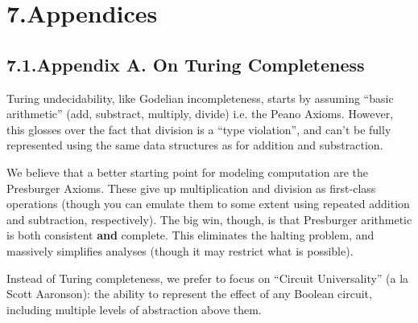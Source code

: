 \documentclass[preprint]{{sigplanconf}}
\begin{document}
\section{7.\hspace*{0.5em}Appendices}\label{sec-appendices}%

\subsection{7.1.\hspace*{0.5em}Appendix A. On Turing Completeness}\label{sec-appendix-a-on-turing-completeness}%

\noindent{}Turing undecidability, like Godelian incompleteness, starts by assuming \textquotedblleft{}basic arithmetic\textquotedblright{} (add, substract, multiply, divide) \textendash{} i.e. the Peano Axioms. However, this glosses over the fact that division is a \textquotedblleft{}type violation\textquotedblright{}, and can't be fully represented using the same data structures as for addition and substraction.%

We believe that a better starting point for modeling computation are the Presburger Axioms.  These give up multiplication and division as first-class operations (though you can emulate them to some extent using repeated addition and subtraction, respectively).  The big win, though, is that Presburger arithmetic is both consistent \textbf{and} complete.  This eliminates the halting problem, and massively simplifies analyses (though it may restrict what is possible).%

Instead of Turing completeness, we prefer to focus on \textquotedblleft{}Circuit Universality\textquotedblright{} (a la Scott Aaronson): the ability to represent the effect of any Boolean circuit, including multiple levels of abstraction above them.%
\end{document}
